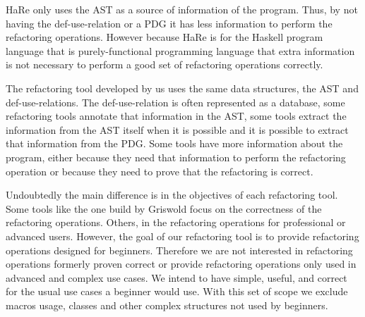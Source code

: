HaRe only uses the AST as a source of information of the program. Thus, by not having
the def-use-relation or a PDG it has less information to perform the refactoring operations.
However because HaRe is for the Haskell program language that is purely-functional
programming language that extra information is not necessary to perform a good set of
refactoring operations correctly.




The refactoring tool developed by us uses the same data structures, the AST and
def-use-relations. The def-use-relation is often represented as a database,
some refactoring tools annotate that information in the AST, %
some tools extract the information from the AST itself when it is possible and
it is possible to extract that information from the PDG.
Some tools have more information about the program, either because they need that
information to perform the refactoring operation or because they need to prove that
the refactoring is correct.  %

Undoubtedly the main difference is in the objectives of each refactoring tool.
Some tools like the one build by Griswold focus on the correctness of the refactoring
operations.
Others, in the refactoring operations for professional or advanced users.
However, the goal of our refactoring tool is to provide refactoring operations
designed for beginners. %
Therefore we are not interested in refactoring operations formerly proven %
correct or provide refactoring operations only used in advanced and complex use cases. %
We intend to have simple, useful, and correct for the usual use cases a beginner would use.
With this set of scope we exclude macros usage, classes and other complex structures %
not used by beginners.


